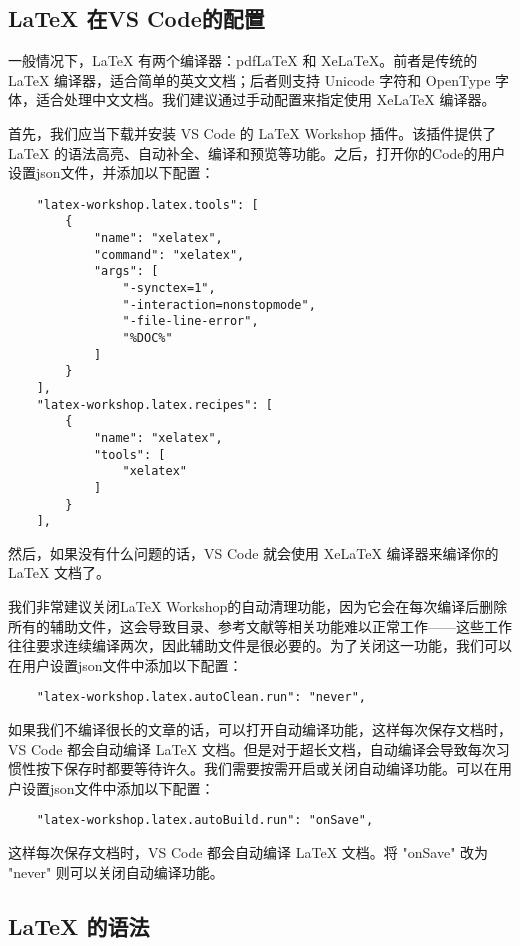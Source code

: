 \documentclass[../main.tex]{subfiles}
\begin{document}
\subsection{LaTeX 在VS Code的配置}

一般情况下，LaTeX 有两个编译器：pdfLaTeX 和 XeLaTeX。前者是传统的 LaTeX 编译器，适合简单的英文文档；后者则支持 Unicode 字符和 OpenType 字体，适合处理中文文档。我们建议通过手动配置来指定使用 XeLaTeX 编译器。

首先，我们应当下载并安装 VS Code 的 LaTeX Workshop 插件。该插件提供了 LaTeX 的语法高亮、自动补全、编译和预览等功能。之后，打开你的Code的用户设置json文件，并添加以下配置：

\begin{lstlisting}
    "latex-workshop.latex.tools": [
        {
            "name": "xelatex",
            "command": "xelatex",
            "args": [
                "-synctex=1",
                "-interaction=nonstopmode",
                "-file-line-error",
                "%DOC%"
            ]
        }
    ],
    "latex-workshop.latex.recipes": [
        {
            "name": "xelatex",
            "tools": [
                "xelatex"
            ]
        }
    ],
\end{lstlisting}

然后，如果没有什么问题的话，VS Code 就会使用 XeLaTeX 编译器来编译你的 LaTeX 文档了。

我们非常建议关闭LaTeX Workshop的自动清理功能，因为它会在每次编译后删除所有的辅助文件，这会导致目录、参考文献等相关功能难以正常工作——这些工作往往要求连续编译两次，因此辅助文件是很必要的。为了关闭这一功能，我们可以在用户设置json文件中添加以下配置：
\begin{lstlisting}
    "latex-workshop.latex.autoClean.run": "never",
\end{lstlisting}

如果我们不编译很长的文章的话，可以打开自动编译功能，这样每次保存文档时，VS Code 都会自动编译 LaTeX 文档。但是对于超长文档，自动编译会导致每次习惯性按下保存时都要等待许久。我们需要按需开启或关闭自动编译功能。可以在用户设置json文件中添加以下配置：
\begin{lstlisting}
    "latex-workshop.latex.autoBuild.run": "onSave",
\end{lstlisting}
这样每次保存文档时，VS Code 都会自动编译 LaTeX 文档。将 "onSave" 改为 "never" 则可以关闭自动编译功能。

\subsection{LaTeX 的语法}
\end{document}
